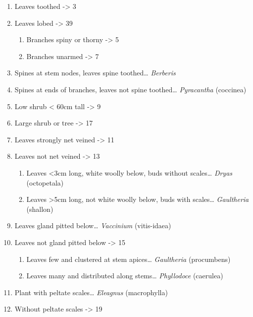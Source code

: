 \documentclass[openany]{book}
\providecommand{\tightlist}{%
  \setlength{\itemsep}{0pt}\setlength{\parskip}{0pt}}
\begin{document}
\begin{enumerate}
\def\labelenumi{\arabic{enumi}.}
\tightlist
\item
  Leaves toothed -\textgreater{} 3
\item
  Leaves lobed -\textgreater{} 39

  \begin{enumerate}
  \def\labelenumii{\arabic{enumii}.}
  \setcounter{enumii}{2}
  \tightlist
  \item
    Branches spiny or thorny -\textgreater{} 5
  \item
    Branches unarmed -\textgreater{} 7
  \end{enumerate}
\item
  Spines at stem nodes, leaves spine toothed\ldots{} \emph{Berberis}
\item
  Spines at ends of branches, leaves not spine toothed\ldots{}
  \emph{Pyracantha} (coccinea)
\item
  Low shrub \textless{} 60cm tall -\textgreater{} 9
\item
  Large shrub or tree -\textgreater{} 17
\item
  Leaves strongly net veined -\textgreater{} 11
\item
  Leaves not net veined -\textgreater{} 13

  \begin{enumerate}
  \def\labelenumii{\arabic{enumii}.}
  \setcounter{enumii}{10}
  \tightlist
  \item
    Leaves \textless{}3cm long, white woolly below, buds without
    scales\ldots{} \emph{Dryas} (octopetala)
  \item
    Leaves \textgreater{}5cm long, not white woolly below, buds with
    scales\ldots{} \emph{Gaultheria} (shallon)
  \end{enumerate}
\item
  Leaves gland pitted below\ldots{} \emph{Vaccinium} (vitis-idaea)
\item
  Leaves not gland pitted below -\textgreater{} 15

  \begin{enumerate}
  \def\labelenumii{\arabic{enumii}.}
  \setcounter{enumii}{14}
  \tightlist
  \item
    Leaves few and clustered at stem apices\ldots{} \emph{Gaultheria}
    (procumbens)
  \item
    Leaves many and distributed along stems\ldots{} \emph{Phyllodoce}
    (caerulea)
  \end{enumerate}
\item
  Plant with peltate scales\ldots{} \emph{Eleagnus} (macrophylla)
\item
  Without peltate scales -\textgreater{} 19


\end{enumerate}
\end{document}
